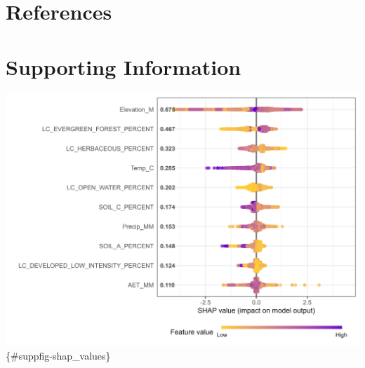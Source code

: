 \documentclass[
]{agujournal2019}
\begin{document}
\section*{References}\label{references}

\section{Supporting Information}\label{supporting-information}

\includegraphics{images/supplemental/shap_summary.png}
\{\#suppfig-shap\_values\}
\end{document}
